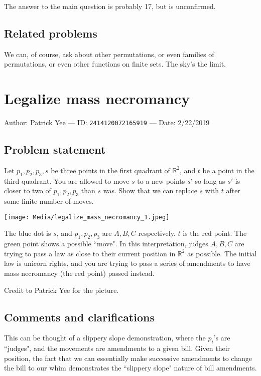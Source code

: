 \documentclass[10pt]{article}
\begin{document}
The answer to the main question is probably 17, but is unconfirmed.

\subsection{Related problems}

We can, of course, ask about other permutations, or even families of permutations, or even other functions on finite sets. The sky's the limit.

\pagebreak

\section{Legalize mass necromancy}

Author: Patrick Yee --- ID: \verb`2414120072165919` --- Date: 2/22/2019

\subsection{Problem statement}

Let $p_1,p_2,p_3,s$ be three points in the first quadrant of $\mathbb{R}^2$, and $t$ be a point in the third quadrant. You are allowed to move $s$ to a new points $s'$ so long as $s'$ is closer to two of $p_1,p_2,p_3$ than $s$ was. Show that we can replace $s$ with $t$ after some finite number of moves.

\texttt{[image: Media/legalize\_mass\_necromancy\_1.jpeg]}

The blue dot is $s$, and $p_1,p_2,p_3$ are $A,B,C$ respectively. $t$ is the red point. The green point shows a possible ``move". In this interpretation, judges $A,B,C$ are trying to pass a law as close to their current position in $\mathbb{R}^2$ as possible. The initial law is unicorn rights, and you are trying to pass a series of amendments to have mass necromancy (the red point) passed instead.

Credit to Patrick Yee for the picture.

\subsection{Comments and clarifications}

This can be thought of a slippery slope demonstration, where the $p_i$'s are ``judges", and the movements are amendments to a given bill. Given their position, the fact that we can essentially make successive amendments to change the bill to our whim demonstrates the ``slippery slope" nature of bill amendments.
\end{document}
